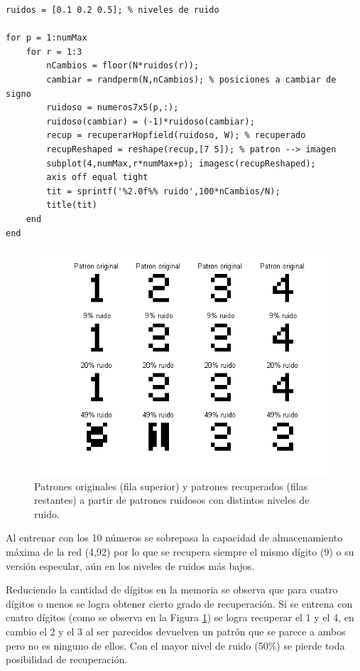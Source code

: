 \documentclass[11pt,a4paper,final]{article}
\begin{document}
\begin{verbatim}
ruidos = [0.1 0.2 0.5]; % niveles de ruido

for p = 1:numMax
    for r = 1:3
        nCambios = floor(N*ruidos(r));
        cambiar = randperm(N,nCambios); % posiciones a cambiar de signo
        ruidoso = numeros7x5(p,:);
        ruidoso(cambiar) = (-1)*ruidoso(cambiar);
        recup = recuperarHopfield(ruidoso, W); % recuperado
        recupReshaped = reshape(recup,[7 5]); % patron --> imagen
        subplot(4,numMax,r*numMax+p); imagesc(recupReshaped);
        axis off equal tight
        tit = sprintf('%2.0f%% ruido',100*nCambios/N);
        title(tit)
    end
end
\end{verbatim}

\begin{figure}
\includegraphics [width=\textwidth]{Ejercicio6_04.png}
\caption{Patrones originales (fila superior) y patrones recuperados (filas restantes) a partir de patrones ruidosos con distintos niveles de ruido.}
\label{fig:ejercicio64}
\end{figure}

Al entrenar con los 10 números se sobrepasa la capacidad de almacenamiento máxima de la red (4,92) por lo que se recupera siempre el mismo dígito (9) o su versión especular, aún en los niveles de ruidos más bajos.

Reduciendo la cantidad de dígitos en la memoria se observa que para cuatro dígitos o menos se logra obtener cierto grado de recuperación. Si se entrena con cuatro dígitos (como se observa en la Figura \ref{fig:ejercicio64}) se logra recuperar el 1 y el 4, en cambio el 2 y el 3 al ser parecidos devuelven un patrón que se parece a ambos pero no es ninguno de ellos. Con el mayor nivel de ruido (50\%) se pierde toda posibilidad de recuperación.
\end{document}
